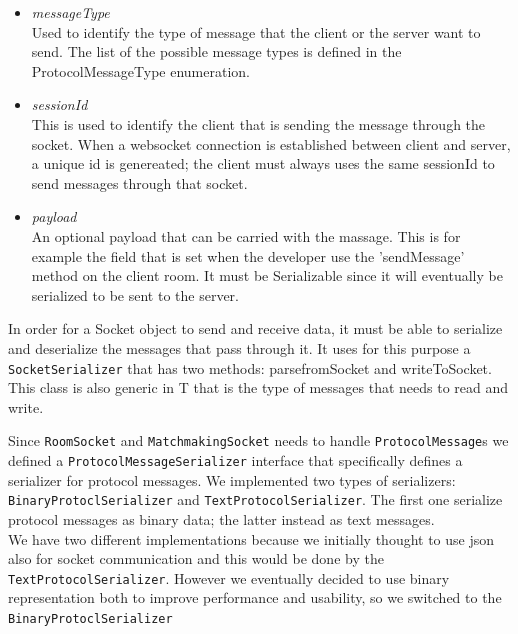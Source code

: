 \begin{itemize}
	\item \textit{messageType} \\
	Used to identify the type of message that the client or the server want to send. The list of the possible message types is defined in the ProtocolMessageType enumeration.
	\item \textit{sessionId} \\
	This is used to identify the client that is sending the message through the socket. When a websocket connection is established between client and server, a unique id is genereated; the client must always uses the same sessionId to send messages through that socket.
	\item \textit{payload} \\ 
	An optional payload that can be carried with the massage. This is for example the field that is set when the developer use the 'sendMessage' method on the client room. It must be Serializable since it will eventually be serialized to be sent to the server.
\end{itemize}

In order for a Socket object to send and receive data, it must be able to serialize and deserialize the messages that pass through it. It uses for this purpose a \texttt{SocketSerializer} that has two methods: parsefromSocket and writeToSocket. This class is also generic in T that is the type of messages that needs to read and write.

Since \texttt{RoomSocket} and \texttt{MatchmakingSocket} needs to handle \texttt{ProtocolMessage}s we defined a \texttt{ProtocolMessageSerializer} interface that specifically defines a serializer for protocol messages. We implemented two types of serializers: \texttt{BinaryProtoclSerializer} and \texttt{TextProtocolSerializer}. The first one serialize protocol messages as binary data; the latter instead as text messages.
\\
We have two different implementations because we initially thought to use json also for socket communication and this would be done by the \texttt{TextProtocolSerializer}. However we eventually decided to use binary representation both to improve performance and usability, so we switched to the \texttt{BinaryProtoclSerializer}


